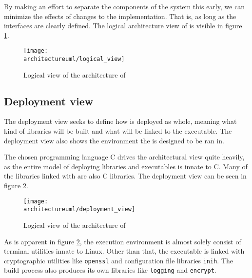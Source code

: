 By making an effort to separate the components of the system this early, we can
minimize the effects of changes to the implementation. That is, as long as the
interfaces are clearly defined. The logical architecture view of \pman is
visible in figure \ref{dia:logical_view}.

\begin{figure}[H]
    \centering
    \centerline{\texttt{[image: \\architectureuml/logical\_view]}}
    \caption{Logical view of the architecture of \pman}
    \label{dia:logical_view}
\end{figure}

\subsection{Deployment view}

The deployment view seeks to define how \pman is deployed as whole, meaning
what kind of libraries will be built and what will be linked to the executable.
The deployment view also shows the environment the \pman is designed to be
ran in.

The chosen programming language C drives the architectural view quite heavily,
as the entire model of deploying libraries and executables is innate to C. Many
of the libraries linked with \pman are also C libraries. The deployment view
can be seen in figure \ref{dia:deployment_view}.

\begin{figure}[H]
    \centering
    \centerline{\texttt{[image: \\architectureuml/deployment\_view]}}
    \caption{Logical view of the architecture of \pman}
    \label{dia:deployment_view}
\end{figure}

As is apparent in figure \ref{dia:deployment_view}, the execution environment
is almost solely consist of terminal utilities innate to Linux. Other than that,
the \pman executable is linked with cryptographic utilities like \texttt{openssl}
and configuration file libraries \texttt{inih}. The build process also produces
its own libraries like \texttt{logging} and \texttt{encrypt}.
